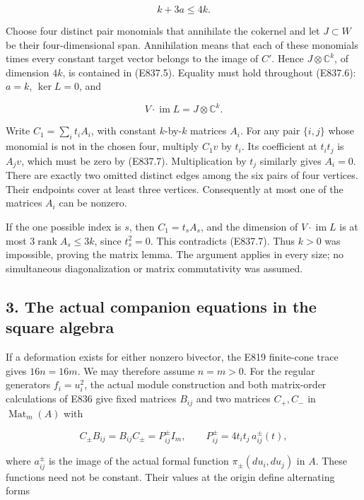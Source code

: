 \[
 k+3a\le4k.
 \tag{E837.6}
\]

Choose four distinct pair monomials that annihilate the cokernel and let
\(J\subset W\) be their four-dimensional span. Annihilation means that
each of these monomials times every constant target vector belongs to
the image of \(C'\). Hence \(J\otimes\mathbb C^k\), of dimension \(4k\),
is contained in (E837.5). Equality must hold throughout (E837.6):
\(a=k\), \(\ker L=0\), and

\[
 V\cdot\operatorname{im}L=J\otimes\mathbb C^k.
 \tag{E837.7}
\]

Write \(C_1=\sum_i t_i A_i\), with constant \(k\)-by-\(k\) matrices
\(A_i\). For any pair \(\{i,j\}\) whose monomial is not in the chosen
four, multiply \(C_1v\) by \(t_i\). Its coefficient at \(t_it_j\) is
\(A_jv\), which must be zero by (E837.7). Multiplication by \(t_j\)
similarly gives \(A_i=0\). There are exactly two omitted distinct edges
among the six pairs of four vertices. Their endpoints cover at least
three vertices. Consequently at most one of the matrices \(A_i\) can be
nonzero.

If the one possible index is \(s\), then \(C_1=t_sA_s\), and the
dimension of \(V\cdot\operatorname{im}L\) is at most
\(3\operatorname{rank}A_s\le3k\), since \(t_s^2=0\). This contradicts
(E837.7). Thus \(k>0\) was impossible, proving the matrix lemma. The
argument applies in every size; no simultaneous diagonalization or
matrix commutativity was assumed.

\subsection{3. The actual companion equations in the square
algebra}\label{SF-E837:the-actual-companion-equations-in-the-square-algebra}

If a deformation exists for either nonzero bivector, the E819
finite-cone trace gives \(16n=16m\). We may therefore assume \(n=m>0\).
For the regular generators \(f_i=u_i^2\), the actual module construction
and both matrix-order calculations of E836 give fixed matrices
\(B_{ij}\) and two matrices \(C_+,C_-\) in \(\operatorname{Mat}_m(A)\)
with

\[
 C_\pm B_{ij}=B_{ij}C_\pm=P^\pm_{ij}I_m,
 \qquad
 P^\pm_{ij}=4t_it_j\,a^\pm_{ij}(t),
 \tag{E837.8}
\]

where \(a^\pm_{ij}\) is the image of the actual formal function
\(\pi_\pm(du_i,du_j)\) in \(A\). These functions need not be constant.
Their values at the origin define alternating forms

